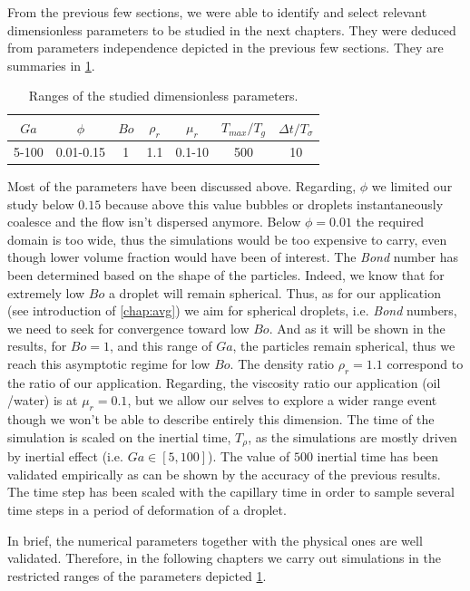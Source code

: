 From the previous few sections, we were able to identify and select relevant dimensionless parameters 
to be studied in the next chapters. 
They were deduced from parameters independence depicted in the previous few sections.
They are summaries in \ref{tab:parameters2}.
\begin{table}
    \caption{Ranges of the studied dimensionless parameters.}
    \centering
    \begin{tabular}{|c|c|c|c|c|c|c|} \hline
        $Ga$ &
        $\phi$ & 
        $Bo$ &
        $\rho_r$ &
        $\mu_r$ &
        $T_{max}/T_g$ &
        $\Delta t/T_{\sigma}$\\ \hline
        5-100
        &0.01-0.15
        & 1 
        & 1.1
        & 0.1-10
        & 500
        & 10 \\\hline
    \end{tabular}
    \label{tab:parameters2}
\end{table}
Most of the parameters have been discussed above. 
Regarding, $\phi$ we limited our study below $0.15$ because above this value bubbles or droplets instantaneously coalesce and the flow isn't dispersed anymore. 
Below $\phi =0.01$ the required domain is too wide, thus the simulations would be too expensive to carry, even though lower volume fraction would have been of interest. 
The \textit{Bond} number has been determined based on the shape of the particles. 
Indeed, we know that for extremely low $Bo$ a droplet will remain spherical. 
Thus, as for our application (see introduction of \ref{chap:avg}) we aim for spherical droplets, i.e. \textit{Bond} numbers, we need to seek for convergence toward low $Bo$. 
And as it will be shown in the results, for $Bo =1$, and this range of $Ga$, the particles remain spherical, thus we reach this asymptotic regime for low $Bo$. 
The density ratio $\rho_r = 1.1$ correspond to the ratio of our application. 
Regarding, the viscosity ratio our application (oil /water) is at $\mu_r=0.1$, but we allow our selves to explore a wider range event though we won't be able to describe entirely this dimension. 
The time of the simulation is scaled on the inertial time, $T_\rho$, as the simulations are mostly driven by inertial effect (i.e. $Ga \in [5,100]$). 
The value of $500$ inertial time has been validated empirically as can be shown by the accuracy of the previous results. 
The time step has been scaled with the capillary time in order to sample several time steps in a period of deformation of a droplet. 

In brief, the numerical parameters together with the physical ones are well validated.
Therefore, in the following chapters we carry out simulations in the restricted ranges of the parameters depicted \ref{tab:parameters2}.